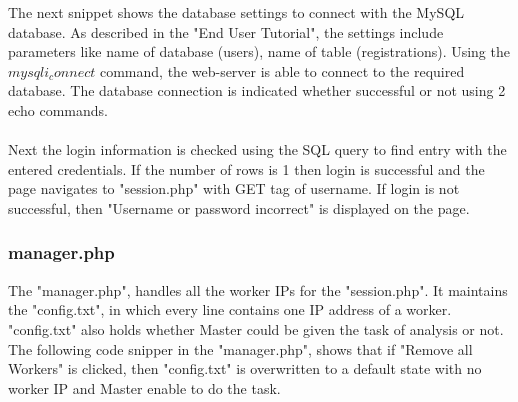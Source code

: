 \documentclass{article}
\begin{document}
The next snippet shows the database settings to connect with the MySQL database. As described in the "End User Tutorial", the settings include parameters like name of database (users), name of table (registrations). Using the $mysqli_connect$ command, the web-server is able to connect to the required database. The database connection is indicated whether successful or not using 2 echo commands.\\ \\
Next the login information is checked using the SQL query to find entry with the entered credentials. If the number of rows is 1 then login is successful and the page navigates to "session.php" with GET tag of username. If login is not successful, then "Username or password incorrect" is displayed on the page.

\subsubsection{manager.php}
The "manager.php", handles all the worker IPs for the "session.php". It maintains the "config.txt", in which every line contains one IP address of a worker. "config.txt" also holds whether Master could be given the task of analysis or not. The following code snipper in the "manager.php", shows that if "Remove all Workers" is clicked, then "config.txt" is overwritten to a default state with no worker IP and Master enable to do the task.
\end{document}

